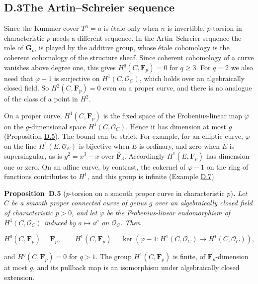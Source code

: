 \documentclass[11pt]{article}
\newenvironment{bpstatement}[2]{\par\addvspace{0.6\baselineskip}\noindent\textbf{#1}#2\textbf{.}\enspace\ignorespaces}
  {\par\addvspace{0.4\baselineskip}}
\newenvironment{bpstatementit}[2]{\begin{bpstatement}{#1}{#2}\itshape\ignorespaces}{\end{bpstatement}}
\begin{document}
\subsection*{\texorpdfstring{D.3\quad The Artin–Schreier sequence}{D.3 The Artin–Schreier sequence}}
\label{bp16}%
\label{bp17}%
Since the Kummer cover \(T^n=a\) is étale only when \(n\) is invertible, \(p\)-torsion in characteristic \(p\) needs a different sequence. In the Artin–Schreier sequence the role of \(\mathbf G_m\) is played by the additive group, whose étale cohomology is the coherent cohomology of the structure sheaf. Since coherent cohomology of a curve vanishes above degree one, this gives \(H^q(C,\mathbf F_p)=0\) for \(q\geq3\). For \(q=2\) we also need that \(\varphi-1\) is surjective on \(H^1(C,\mathcal O_C)\), which holds over an algebraically closed field. So \(H^2(C,\mathbf F_p)=0\) even on a proper curve, and there is no analogue of the class of a point in \(H^2\).

On a proper curve, \(H^1(C,\mathbf F_p)\) is the fixed space of the Frobenius-linear map \(\varphi\) on the \(g\)-dimensional space \(H^1(C,\mathcal O_C)\). Hence it has dimension at most \(g\) (Proposition \hyperref[bp18]{D.5}). The bound can be strict. For example, for an elliptic curve, \(\varphi\) on the line \(H^1(E,\mathcal O_E)\) is bijective when \(E\) is ordinary, and zero when \(E\) is supersingular, as is \(y^2=x^3-x\) over \(\overline{\mathbf F}_3\). Accordingly \(H^1(E,\mathbf F_p)\) has dimension one or zero. On an affine curve, by contrast, the cokernel of \(\varphi-1\) on the ring of functions contributes to \(H^1\), and this group is infinite (Example \hyperref[bp24]{D.7}).

\label{bp18}%
\begin{bpstatementit}{Proposition~D.5}{ ($p$-torsion on a smooth proper curve in characteristic $p$)}
Let \(C\) be a smooth proper connected curve of genus \(g\) over an algebraically closed field of characteristic \(p>0\), and let \(\varphi\) be the Frobenius-linear endomorphism of \(H^1(C,\mathcal O_C)\) induced by \(a\mapsto a^p\) on \(\mathcal O_C\).  Then

\[
H^0(C,\mathbf F_p)=\mathbf F_p,\qquad
H^1(C,\mathbf F_p)=
\ker(\varphi-1:H^1(C,\mathcal O_C)\to H^1(C,\mathcal O_C)),
\]

and \(H^q(C,\mathbf F_p)=0\) for \(q>1\).  The group \(H^1(C,\mathbf F_p)\) is finite, of \(\mathbf F_p\)-dimension at most \(g\), and its pullback map is an isomorphism under algebraically closed extension.
\end{bpstatementit}
\end{document}
